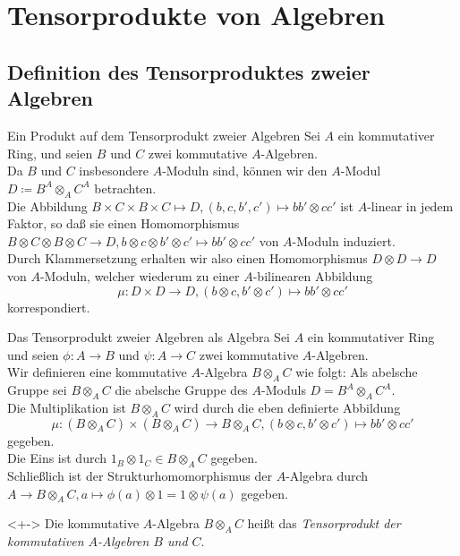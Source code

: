 \section{Tensorprodukte von Algebren}

\subsection{Definition des Tensorproduktes zweier Algebren}

\begin{frame}{Ein Produkt auf dem Tensorprodukt zweier Algebren}
	Sei \(A\) ein kommutativer Ring, und seien \(B\) und \(C\) zwei kommutative \(A\)-Algebren.
	\\
	Da \(B\) und \(C\) insbesondere \(A\)-Moduln sind, können wir den \(A\)-Modul \(D \coloneqq B^A \otimes_A C^A\)
	betrachten.
	\\
	Die Abbildung \(B \times C \times B \times C \mapsto D, (b, c, b', c') \mapsto bb' \otimes cc'\)
	ist \(A\)-linear in jedem Faktor, so daß sie einen Homomorphismus
	\(B \otimes C \otimes B \otimes C \to D, b \otimes c \otimes b' \otimes c' \mapsto bb' \otimes cc'\)
	von \(A\)-Moduln induziert.
	\\
	Durch Klammersetzung erhalten wir also einen Homomorphismus \(D \otimes D \to D\) von \(A\)-Moduln,
	welcher wiederum zu einer \(A\)-bilinearen Abbildung
	\[
		\mu\colon D \times D \to D, (b \otimes c, b' \otimes c') \mapsto bb' \otimes cc'
	\]
	korrespondiert.
\end{frame}

\begin{frame}{Das Tensorprodukt zweier Algebren als Algebra}
	Sei \(A\) ein kommutativer Ring und seien \(\phi\colon A \to B\) und \(\psi\colon A \to C\) zwei
	kommutative \(A\)-Algebren.
	\\
	Wir definieren eine kommutative \(A\)-Algebra \(B \otimes_A C\) wie folgt: Als abelsche Gruppe sei
	\(B \otimes_A C\) die abelsche Gruppe des \(A\)-Moduls \(D = B^A \otimes_A C^A\).
	\\
	Die Multiplikation ist \(B \otimes_A C\) wird durch die eben definierte Abbildung
	\[
		\mu\colon (B \otimes_A C) \times (B \otimes_A C) \to B \otimes_A C, (b \otimes c, b' \otimes c') \mapsto bb' \otimes cc'
	\]
	gegeben.
	\\
	Die Eins ist durch \(1_B \otimes 1_C \in B \otimes_A C\) gegeben.
	\\
	Schließlich ist der Strukturhomomorphismus der \(A\)-Algebra durch \(A \to B \otimes_A C, a \mapsto \phi(a) \otimes
	1 = 1 \otimes \psi(a)\) gegeben.
	\begin{definition}<+->
		Die kommutative \(A\)-Algebra \(B \otimes_A C\) heißt das \emph{Tensorprodukt der kommutativen \(A\)-Algebren \(B\) und \(C\)}.
	\end{definition}
\end{frame}

